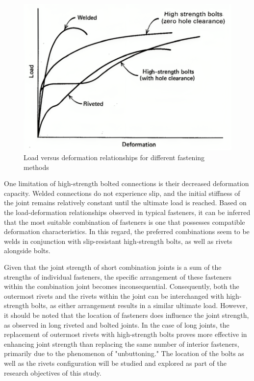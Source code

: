 \begin{figure}[htbp]
    \centering
    \includegraphics[width=0.75\linewidth]{imgs//ch2/hsbrive-1969.png}
    \caption{Load versus deformation relationships for different fastening methods \cite{steinhardt1969-hybrid}}
    \label{fig-hsbriv-stei}
\end{figure}


One limitation of high-strength bolted connections is their decreased deformation capacity. Welded connections do not experience slip, and the initial stiffness of the joint remains relatively constant until the ultimate load is reached. Based on the load-deformation relationships observed in typical fasteners, it can be inferred that the most suitable combination of fasteners is one that possesses compatible deformation characteristics. In this regard, the preferred combinations seem to be welds in conjunction with slip-resistant high-strength bolts, as well as rivets alongside bolts.

Given that the joint strength of short combination joints is a sum of the strengths of individual fasteners, the specific arrangement of these fasteners within the combination joint becomes inconsequential. Consequently, both the outermost rivets and the rivets within the joint can be interchanged with high-strength bolts, as either arrangement results in a similar ultimate load. However, it should be noted that the location of fasteners does influence the joint strength, as observed in long riveted and bolted joints. In the case of long joints, the replacement of outermost rivets with high-strength bolts proves more effective in enhancing joint strength than replacing the same number of interior fasteners, primarily due to the phenomenon of "unbuttoning." The location of the bolts as well as the rivets configuration will be studied and explored as part of the research objectives of this study.

